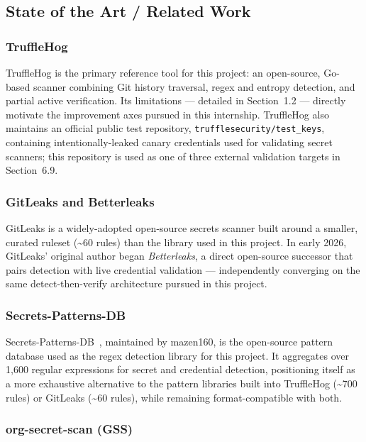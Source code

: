 \documentclass[12pt]{article}
\begin{document}
\subsection{State of the Art / Related Work}

\subsubsection{TruffleHog}

TruffleHog is the primary reference tool for this project: an open-source, Go-based scanner combining Git history traversal, regex and entropy detection, and partial active verification. Its limitations --- detailed in Section~1.2 --- directly motivate the improvement axes pursued in this internship. TruffleHog also maintains an official public test repository, \texttt{trufflesecurity/test\_keys}, containing intentionally-leaked canary credentials used for validating secret scanners; this repository is used as one of three external validation targets in Section~6.9.

\subsubsection{GitLeaks and Betterleaks}

GitLeaks is a widely-adopted open-source secrets scanner built around a smaller, curated ruleset (\textasciitilde60 rules) than the library used in this project. In early 2026, GitLeaks' original author began \emph{Betterleaks}, a direct open-source successor that pairs detection with live credential validation --- independently converging on the same detect-then-verify architecture pursued in this project.

\subsubsection{Secrets-Patterns-DB}

Secrets-Patterns-DB~\cite{secretspatternsdb}, maintained by mazen160, is the open-source pattern database used as the regex detection library for this project. It aggregates over 1,600 regular expressions for secret and credential detection, positioning itself as a more exhaustive alternative to the pattern libraries built into TruffleHog (\textasciitilde700 rules) or GitLeaks (\textasciitilde60 rules), while remaining format-compatible with both.

\subsubsection{org-secret-scan (GSS)}
\end{document}
